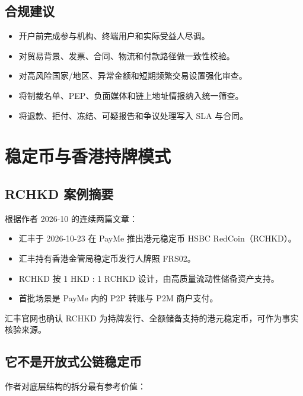 \section{合规建议}\label{ux5408ux89c4ux5efaux8bae}

\begin{itemize}
\tightlist
\item
  开户前完成参与机构、终端用户和实际受益人尽调。
\item
  对贸易背景、发票、合同、物流和付款路径做一致性校验。
\item
  对高风险国家/地区、异常金额和短期频繁交易设置强化审查。
\item
  将制裁名单、PEP、负面媒体和链上地址情报纳入统一筛查。
\item
  将退款、拒付、冻结、可疑报告和争议处理写入 SLA 与合同。
\end{itemize}

\chapter{稳定币与香港持牌模式}\label{ux7a33ux5b9aux5e01ux4e0eux9999ux6e2fux6301ux724cux6a21ux5f0f}

\section{RCHKD 案例摘要}\label{rchkd-ux6848ux4f8bux6458ux8981}

根据作者 2026-10 的连续两篇文章：

\begin{itemize}
\tightlist
\item
  汇丰于 2026-10-23 在 PayMe 推出港元稳定币 HSBC RedCoin（RCHKD）。
\item
  汇丰持有香港金管局稳定币发行人牌照 FRS02。
\item
  RCHKD 按 1 HKD : 1 RCHKD 设计，由高质量流动性储备资产支持。
\item
  首批场景是 PayMe 内的 P2P 转账与 P2M 商户支付。
\end{itemize}

汇丰官网也确认 RCHKD 为持牌发行、全额储备支持的港元稳定币，可作为事实核验来源。

\section{它不是开放式公链稳定币}\label{ux5b83ux4e0dux662fux5f00ux653eux5f0fux516cux94feux7a33ux5b9aux5e01}

作者对底层结构的拆分最有参考价值：

